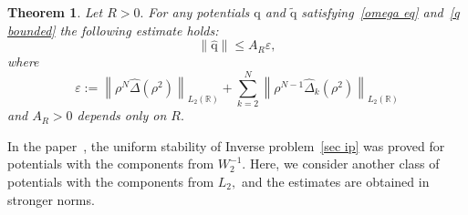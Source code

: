 \documentclass[a4paper, 12pt] {article}
\theoremstyle{plain}
\newtheorem{theorem}{\indent Theorem}
\theoremstyle{remark}
\theoremstyle{plain}
\theoremstyle{definition}
\numberwithin{equation}{section}
\begin{document}
\begin{theorem} \label{444}
Let $R>0.$
For any potentials $\mathrm{ q}$ and $\mathrm{\tilde q}$ satisfying~\eqref{omega eq} and~\eqref{q bounded} the following estimate holds:
\begin{equation*}
\| \mathrm{\hat q}\| \le A_R \varepsilon,
\end{equation*}
where
$$\varepsilon := \left\| \rho^N \hat \Delta(\rho^2)\right\|_{L_2(\mathbb R)} + \sum_{k=2}^N \left\| \rho^{N-1}\hat \Delta_k(\rho^2)\right\|_{L_2(\mathbb R)}$$
and
$A_R>0$ depends only on $R.$
\end{theorem}
In the paper~\cite{tree}, the uniform stability of Inverse problem~\ref{sec ip} was proved for potentials with the components from $W^{-1}_2.$
Here, we consider another class of potentials with the components from $L_2,$ and the estimates are obtained in stronger norms.
\end{document}

